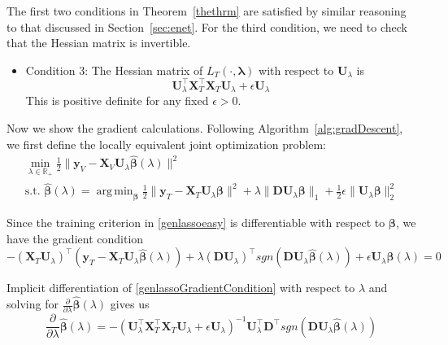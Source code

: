 \documentclass[12pt,letterpaper]{article}
\DeclareMathOperator*{\argmin}{arg\,min}
\begin{document}
The first two conditions in Theorem~\ref{thethrm} are satisfied by similar reasoning to that discussed in Section~\ref{sec:enet}. For the third condition, we need to check that the Hessian matrix is invertible.
\begin{itemize}
\item[] Condition 3: The Hessian matrix of $L_T(\cdot, \boldsymbol{\lambda})$ with respect to $\boldsymbol U_\lambda$ is
\begin{equation}
\boldsymbol U_\lambda^\top \boldsymbol X_T^\top \boldsymbol X_T \boldsymbol U_\lambda + \epsilon \boldsymbol U_\lambda
\end{equation}
This is positive definite for any fixed $\epsilon > 0$.
\hfill {}
\end{itemize}

Now we show the gradient calculations. Following Algorithm~\ref{alg:gradDescent}, we first define the locally equivalent joint optimization problem:
\begin{equation}
\begin{array}{c}
\min_{\lambda \in \mathbb{R}_{+}} \frac{1}{2} \| \boldsymbol{y}_V - \boldsymbol{X}_V \boldsymbol U_\lambda \hat{\boldsymbol{\beta}} (\lambda) \| ^2 \\
\text{s.t. }
\hat{\boldsymbol{\beta}} (\lambda) =
\argmin_{\boldsymbol{\beta}}
\frac{1}{2} \| \boldsymbol{y}_T - \boldsymbol{X}_T \boldsymbol U_\lambda \boldsymbol{\beta} \| ^2
+ \lambda \| \boldsymbol D \boldsymbol U_\lambda \boldsymbol{\beta} \|_1
+ \frac{1}{2} \epsilon \| \boldsymbol U_\lambda \boldsymbol{\beta} \|_2^2
\end{array}
\label{genlassoeasy}
\end{equation}

Since the training criterion in \eqref{genlassoeasy} is differentiable with respect to $\boldsymbol \beta$, we have the gradient condition
\begin{equation}
- (\boldsymbol{X}_T \boldsymbol U_\lambda)^\top (\boldsymbol{y}_T - \boldsymbol{X}_T \boldsymbol U_\lambda \hat {\boldsymbol\beta} (\lambda))
+ \lambda (\boldsymbol D \boldsymbol U_\lambda)^\top sgn(\boldsymbol D\boldsymbol U_\lambda \hat{\boldsymbol \beta}(\lambda))
+ \epsilon \boldsymbol U_\lambda \hat {\boldsymbol \beta}(\lambda)
= 0
\label{genlassoGradientCondition}
\end{equation}

Implicit differentiation of \eqref{genlassoGradientCondition} with respect to $\lambda$ and solving for $\frac{\partial}{\partial \lambda} \hat{\boldsymbol \beta}(\lambda)$ gives us
\begin{equation}
\frac{\partial}{\partial \lambda} \hat{\boldsymbol \beta}(\lambda) =
-(\boldsymbol U_\lambda^\top \boldsymbol X_T^\top \boldsymbol X_T \boldsymbol U_\lambda  + \epsilon \boldsymbol U_\lambda)^{-1}
\boldsymbol U_\lambda^\top \boldsymbol D^\top sgn(\boldsymbol D \boldsymbol U_\lambda \hat{\boldsymbol \beta}(\lambda))
\label{genlassoParamDeriv}
\end{equation}
\end{document}
